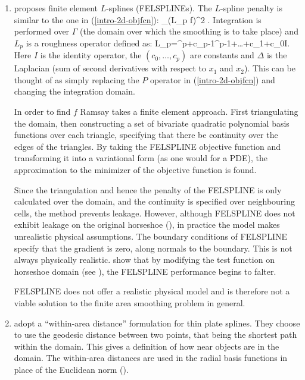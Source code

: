 \begin{enumerate}
\item {} proposes finite element $L$-splines (FELSPLINEs). The $L$-spline penalty is similar to the one in (\ref{intro-2d-objfcn}):
\be
\int_\Gamma (L_p f)^2 .
\ee
Integration is performed over $\Gamma$ (the domain over which the smoothing is to take place) and $L_p$ is a roughness operator defined as:
\be
L_p=\Delta^p+c_{p-1}\Delta^{p-1}+\dots+c_1\Delta+c_0I.
\ee
Here $I$ is the identity operator, the $(c_0,\dots, c_p)$ are constants and $\Delta$ is the Laplacian (sum of second derivatives with respect to $x_1$ and $x_2$). This can be thought of as simply replacing the $P$ operator in (\ref{intro-2d-objfcn}) and changing the integration domain. 

In order to find $f$ Ramsay takes a finite element approach. First triangulating the domain, then constructing a set of bivariate quadratic polynomial basis functions over each triangle, specifying that there be continuity over the edges of the triangles. By taking the FELSPLINE objective function and transforming it into a variational form (as one would for a PDE), the approximation to the minimizer of the objective function is found.

Since the triangulation and hence the penalty of the FELSPLINE is only calculated over the domain, and the continuity is specified over neighbouring cells, the method prevents leakage. However, although FELSPLINE does not exhibit leakage on the original horseshoe (), in practice the model makes unrealistic physical assumptions. The boundary conditions of FELSPLINE specify that the gradient is zero, along normals to the boundary. This is not always physically realistic.  show that by modifying the test function on horseshoe domain (see ), the FELSPLINE performance begins to falter.

FELSPLINE does not offer a realistic physical model and is therefore not a viable solution to the finite area smoothing problem in general.

\item {} adopt a ``within-area distance'' formulation for thin plate splines. They choose to use the geodesic distance between two points, that being the shortest path within the domain. This gives a definition of how near objects are in the domain. The within-area distances are used in the radial basis functions in place of the Euclidean norm ().


\end{enumerate}
